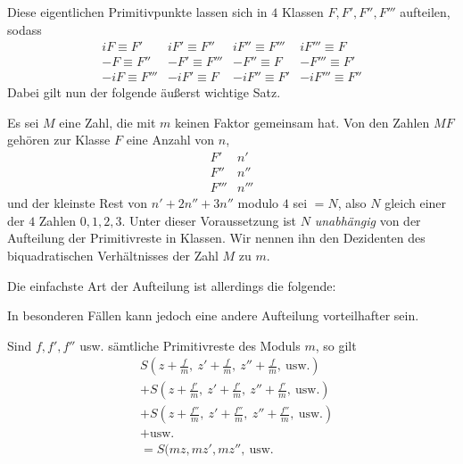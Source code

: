 Diese eigentlichen Primitivpunkte lassen sich in $4$ Klassen $F,F',F'',F'''$ aufteilen, sodass
\[
\begin{array}{llll}
iF\equiv F'&iF'\equiv F''&iF''\equiv F'''&iF'''\equiv F\\
-F\equiv F''&-F'\equiv F'''&-F''\equiv F&-F'''\equiv F'\\
-iF\equiv F'''&-iF'\equiv F&-iF''\equiv F'&-iF'''\equiv F''
\end{array}
\]
Dabei gilt nun der folgende äußerst wichtige Satz.

Es sei $M$ eine Zahl, die mit $m$ keinen Faktor gemeinsam hat. Von den Zahlen $MF$ gehören zur Klasse $F$ eine Anzahl von $n$,
\[
\begin{array}{cc}F'&n'\\F''&n''\\F'''&n'''\end{array}
\]
und der kleinste Rest von $n'+2n''+3n''$ modulo $4$ sei $=N$, also $N$ gleich einer der $4$ Zahlen $0,1,2,3$. Unter dieser Voraussetzung ist $N$ \emph{unabhängig} von der Aufteilung der Primitivreste in Klassen. Wir nennen ihn den Dezidenten des biquadratischen Verhältnisses der Zahl $M$ zu $m$.

Die einfachste Art der Aufteilung ist allerdings die folgende:
\begin{center}\resizebox{.35\textwidth}{!}{}\end{center}
In besonderen Fällen kann jedoch eine andere Aufteilung vorteilhafter sein.

Sind $f,f',f''$ usw. sämtliche Primitivreste des Moduls $m$, so gilt
\[
\begin{aligned}
&S(z+\tfrac fm,\ z'+\tfrac fm,\ z''+\tfrac fm,\ \text{usw.})\\
&+S(z+\tfrac{f'}m,\ z'+\tfrac{f'}m,\ z''+\tfrac{f'}m,\ \text{usw.})\\
&+S(z+\tfrac{f''}m,\ z'+\tfrac{f''}m,\ z''+\tfrac{f''}m,\ \text{usw.})\\
&+\text{usw.}\\
&=S(mz,mz',mz'',\ \text{usw.}
\end{aligned}
\]
